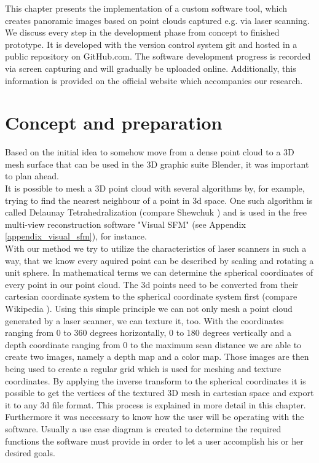 This chapter presents the implementation of a custom software tool, which creates panoramic images based on point clouds captured e.g. via laser scanning. We discuss every step in the development phase from concept to finished prototype. It is developed with the version control system git and hosted in a public repository on GitHub.com. The software development progress is recorded via screen capturing and will gradually be uploaded online. Additionally, this information is provided on the official website which accompanies our research.

\section{Concept and preparation}

Based on the initial idea to somehow move from a dense point cloud to a 3D mesh surface that can be used in the 3D graphic suite Blender, it was important to plan ahead.\\
It is possible to mesh a 3D point cloud with several algorithms by, for example, trying to find the nearest neighbour of a point in 3d space. One such algorithm is called Delaunay Tetrahedralization  (compare Shewchuk \parencite{Shewchuk02constraineddelaunay}) and is used in the free multi-view reconstruction software "Visual SFM" (see Appendix \ref{appendix_visual_sfm}), for instance.\\
With our method we try to utilize the characteristics of laser scanners in such a way, that we know every aquired point can be described by scaling and rotating a unit sphere. In mathematical terms we can determine the spherical coordinates of every point in our point cloud. The 3d points need to be converted from their cartesian coordinate system to the spherical coordinate system first (compare Wikipedia \parencite{wiki:CoordinateSystem}). Using this simple principle we can not only mesh a point cloud generated by a laser scanner, we can texture it, too. With the coordinates ranging from 0 to 360 degrees horizontally, 0 to 180 degrees vertically and a depth coordinate ranging from 0 to the maximum scan distance we are able to create two images, namely a depth map and a color map. Those images are then being used to create a regular grid which is used for meshing and texture coordinates. By applying the inverse transform to the spherical coordinates it is possible to get the vertices of the textured 3D mesh in cartesian space and export it to any 3d file format. This process is explained in more detail in this chapter.\\
Furthermore it was neccessary to know how the user will be operating with the software. Usually a use case diagram is created to determine the required functions the software must provide in order to let a user accomplish his or her desired goals.

